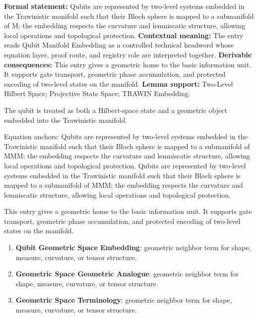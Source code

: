 \begingroup\footnotesize\setlength{\emergencystretch}{3em}\sloppy
\textbf{Formal statement:} Qubits are represented by two-level systems embedded in the Trawinistic manifold such that their Bloch sphere is mapped to a submanifold of M; the embedding respects the curvature and lemniscatic structure, allowing local operations and topological protection. \textbf{Contextual meaning:} The entry reads Qubit Manifold Embedding as a controlled technical headword whose equation layer, proof route, and registry role are interpreted together. \textbf{Derivable consequences:} This entry gives a geometric home to the basic information unit. It supports gate transport, geometric phase accumulation, and protected encoding of two-level states on the manifold. \textbf{Lemma support:} Two-Level Hilbert Space; Projective State Space; TRAWIN Embedding.\par
\endgroup

The qubit is treated as both a Hilbert-space state and a geometric object embedded into the Trawinistic manifold.

Equation anchors: Qubits are represented by two-level systems embedded in the Trawinistic manifold such that their Bloch sphere is mapped to a submanifold of MMM; the embedding respects the curvature and lemniscatic structure, allowing local operations and topological protection. Qubits are represented by two-level systems embedded in the Trawinistic manifold such that their Bloch sphere is mapped to a submanifold of MMM; the embedding respects the curvature and lemniscatic structure, allowing local operations and topological protection.

This entry gives a geometric home to the basic information unit. It supports gate transport, geometric phase accumulation, and protected encoding of two-level states on the manifold.
\endgroup

\begingroup\footnotesize\sloppy
\begin{enumerate}[leftmargin=1.35em,itemsep=1pt,topsep=1pt,parsep=0pt]
\item \textbf{Qubit Geometric Space Embedding}: geometric neighbor term for shape, measure, curvature, or tensor structure.
\item \textbf{Geometric Space Geometric Analogue}: geometric neighbor term for shape, measure, curvature, or tensor structure.
\item \textbf{Geometric Space Terminology}: geometric neighbor term for shape, measure, curvature, or tensor structure.
\end{enumerate}
\endgroup

